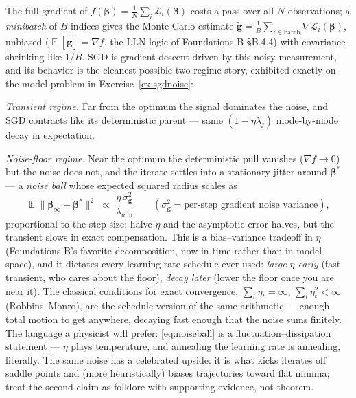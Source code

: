 \documentclass[11pt]{article}
\numberwithin{equation}{section}
\theoremstyle{plain}
\theoremstyle{definition}
\theoremstyle{remark}
\DeclareMathOperator{\E}{\mathbb{E}}
\newcommand{\bbeta}{\bm{\beta}}
\newcommand{\lmin}{\lambda_{\min}}
\begin{document}
The full gradient of $f(\bbeta) = \tfrac1N\sum_i \mathcal{L}_i(\bbeta)$ costs a pass over all $N$ observations; a \emph{minibatch} of $B$ indices gives the Monte Carlo estimate $\tilde{\bm g} = \tfrac1B \sum_{i \in \text{batch}} \nabla \mathcal{L}_i(\bbeta)$, unbiased ($\E[\tilde{\bm g}] = \nabla f$, the LLN logic of Foundations B \S B.4.4) with covariance shrinking like $1/B$. SGD is gradient descent driven by this noisy measurement, and its behavior is the cleanest possible two-regime story, exhibited exactly on the model problem in Exercise~\ref{ex:sgdnoise}:

\emph{Transient regime.} Far from the optimum the signal dominates the noise, and SGD contracts like its deterministic parent --- same $(1 - \eta\lambda_j)$ mode-by-mode decay in expectation.

\emph{Noise-floor regime.} Near the optimum the deterministic pull vanishes ($\nabla f \to 0$) but the noise does not, and the iterate settles into a stationary jitter around $\bbeta^\ast$ --- a \emph{noise ball} whose expected squared radius scales as
\begin{equation}
\E\big\|\bbeta_\infty - \bbeta^\ast\big\|^2 \;\propto\; \frac{\eta\, \sigma^2_{\bm g}}{\lmin}
\qquad (\sigma^2_{\bm g} = \text{per-step gradient noise variance}),
\label{eq:noiseball}
\end{equation}
proportional to the step size: halve $\eta$ and the asymptotic error halves, but the transient slows in exact compensation. This is a bias--variance tradeoff in $\eta$ (Foundations B's favorite decomposition, now in time rather than in model space), and it dictates every learning-rate schedule ever used: \emph{large $\eta$ early} (fast transient, who cares about the floor), \emph{decay later} (lower the floor once you are near it). The classical conditions for exact convergence, $\sum_t \eta_t = \infty$, $\sum_t \eta_t^2 < \infty$ (Robbins--Monro), are the schedule version of the same arithmetic --- enough total motion to get anywhere, decaying fast enough that the noise sums finitely. The language a physicist will prefer: \eqref{eq:noiseball} is a fluctuation--dissipation statement --- $\eta$ plays temperature, and annealing the learning rate is annealing, literally. The same noise has a celebrated upside: it is what kicks iterates off saddle points and (more heuristically) biases trajectories toward flat minima; treat the second claim as folklore with supporting evidence, not theorem.
\end{document}
